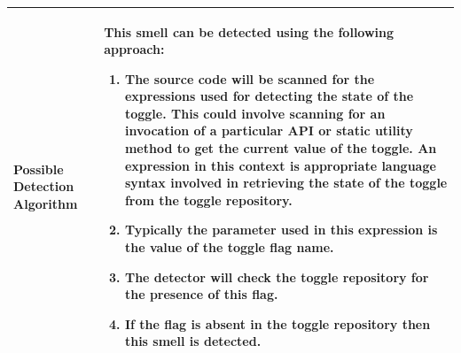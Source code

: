 \documentclass[conference]{IEEEtran}
\begin{document}
\begin{table}[!h]
\begin{tabular}{|p{1.5cm}|p{7cm}|}
Possible Detection Algorithm & This smell can be detected using the following approach:
 \begin{enumerate}
 \item{The source code will be scanned for the expressions used for detecting the state of the toggle. This could involve scanning for an invocation of a particular API or static utility method to get the current value of the toggle. An expression in this context is appropriate language syntax involved in retrieving the state of the toggle from the toggle repository.}
 \item{Typically the parameter used in this expression is the value of the toggle flag name.}
 \item{The detector will check the toggle repository for the presence of this flag.}
 \item{If the flag is absent in the toggle repository then this smell is detected.}
 \end{enumerate}
 
 \\ \hline
\end{tabular}
\label{table:toggle-dead}
\end{table}
\end{document}
